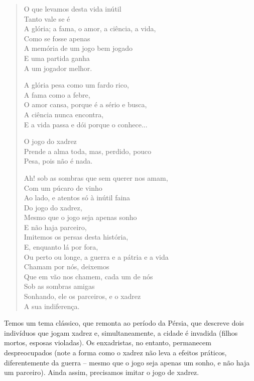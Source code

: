 \begin{verse}
O que levamos desta vida inútil \\
Tanto vale se é \\
A glória; a fama, o amor, a ciência, a vida, \\
Como se fosse apenas \\
A memória de um jogo bem jogado \\
E uma partida ganha \\
A um jogador melhor.

A glória pesa como um fardo rico, \\
A fama como a febre, \\
O amor cansa, porque é a sério e busca, \\
A ciência nunca encontra, \\
E a vida passa e dói porque o conhece...

O jogo do xadrez \\
Prende a alma toda, mas, perdido, pouco \\
Pesa, pois não é nada.

Ah! sob as sombras que sem querer nos amam, \\
Com um púcaro de vinho \\
Ao lado, e atentos só à inútil faina \\
Do jogo do xadrez, \\
Mesmo que o jogo seja apenas sonho \\
E não haja parceiro, \\
Imitemos os persas desta história, \\
E, enquanto lá por fora, \\
Ou perto ou longe, a guerra e a pátria e a vida \\
Chamam por nós, deixemos \\
Que em vão nos chamem, cada um de nós \\
Sob as sombras amigas \\
Sonhando, ele os parceiros, e o xadrez \\
A sua indiferença.
\end{verse}

Temos um tema clássico, que remonta ao período da Pérsia, que descreve dois indivíduos que jogam xadrez e, simultaneamente, a cidade é invadida (filhos mortos, esposas violadas). Os enxadristas, no entanto, permanecem despreocupados (note a forma como o xadrez não leva a efeitos práticos, diferentemente da guerra -- mesmo que o jogo seja apenas um sonho, e não haja um parceiro). Ainda assim, precisamos imitar o jogo de xadrez.

